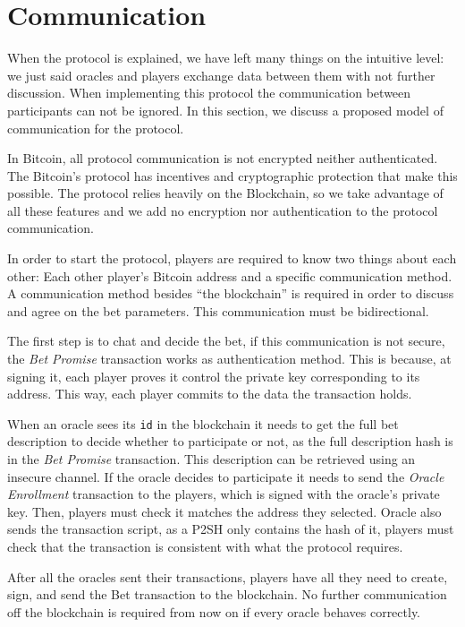 \section{Communication}

When the protocol is explained, we have left many things on the intuitive level:
  we just said oracles and players exchange data between them with not further
  discussion.
When implementing this protocol the communication between participants can
  not be ignored.
In this section, we discuss a proposed model of communication for the protocol.

In Bitcoin, all protocol communication is not encrypted neither authenticated.
The Bitcoin's protocol has incentives and cryptographic protection that make
  this possible.
The protocol relies heavily on the Blockchain, so we take advantage of all these
  features and we add no encryption nor authentication to the protocol
  communication.

In order to start the protocol, players are required to know two things about
  each other: Each other player's Bitcoin address and a specific communication
  method.
A communication method besides ``the blockchain'' is required in order to
  discuss and agree on the bet parameters.
This communication must be bidirectional.

The first step is to chat and decide the bet, if this communication is not
  secure, the \textit{Bet Promise} transaction works as authentication method.
This is because, at signing it, each player proves it control the private key
  corresponding to its address.
This way, each player commits to the data the transaction holds.

When an oracle sees its \texttt{id} in the blockchain it needs to get the full
  bet description to decide whether to participate or not, as the full
  description hash is in the \textit{Bet Promise} transaction.
This description can be retrieved using an insecure channel.
If the oracle decides to participate it needs to send the \textit{Oracle
  Enrollment} transaction to the players, which is signed with the oracle's
  private key.
Then, players must check it matches the address they selected.
Oracle also sends the transaction script, as a P2SH only contains the hash of
  it, players must check that the transaction is consistent with what the
  protocol requires.

After all the oracles sent their transactions, players have all they need
  to create, sign, and send the Bet transaction to the blockchain.
No further communication off the blockchain is required from now on if every
  oracle behaves correctly.

